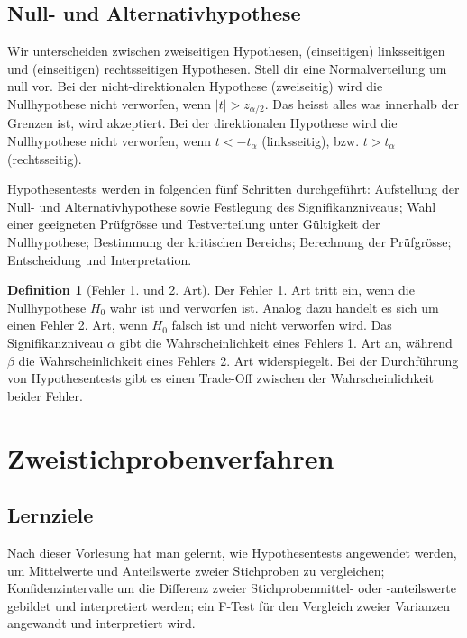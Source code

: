 \documentclass{article}
\theoremstyle{definition}
\newtheorem{definition}{Definition}
\theoremstyle{exercise}
\theoremstyle{solution}
\theoremstyle{lemma}
\begin{document}
\vspace{1em}

\subsection{Null- und Alternativhypothese}
Wir unterscheiden zwischen zweiseitigen Hypothesen, (einseitigen) linksseitigen und (einseitigen) rechtsseitigen Hypothesen. Stell dir eine Normalverteilung um null vor. Bei der nicht-direktionalen Hypothese (zweiseitig) wird die Nullhypothese nicht verworfen, wenn \(|t|>z_{\alpha/2}\). Das heisst alles was innerhalb der Grenzen ist, wird akzeptiert. Bei der direktionalen Hypothese wird die Nullhypothese nicht verworfen, wenn \(t<-t_\alpha\) (linksseitig), bzw. \(t>t_\alpha\) (rechtsseitig).

\vspace{1em}

Hypothesentests werden in folgenden fünf Schritten durchgeführt: Aufstellung der Null- und Alternativhypothese sowie Festlegung des Signifikanzniveaus; Wahl einer geeigneten Prüfgrösse und Testverteilung unter Gültigkeit der Nullhypothese; Bestimmung der kritischen Bereichs; Berechnung der Prüfgrösse; Entscheidung und Interpretation.

\begin{definition}[Fehler 1. und 2. Art]
Der Fehler 1. Art tritt ein, wenn die Nullhypothese \(H_0\) wahr ist und verworfen ist. Analog dazu handelt es sich um einen Fehler 2. Art, wenn \(H_0\) falsch ist und nicht verworfen wird. Das Signifikanzniveau \(\alpha\) gibt die Wahrscheinlichkeit eines Fehlers 1. Art an, während \(\beta\) die Wahrscheinlichkeit eines Fehlers 2. Art widerspiegelt. Bei der Durchführung von Hypothesentests gibt es einen Trade-Off zwischen der Wahrscheinlichkeit beider Fehler.
\end{definition}


\section{Zweistichprobenverfahren}
\subsection{Lernziele}
Nach dieser Vorlesung hat man gelernt, wie Hypothesentests angewendet werden, um Mittelwerte und Anteilswerte zweier Stichproben zu vergleichen; Konfidenzintervalle um die Differenz zweier Stichprobenmittel- oder -anteilswerte gebildet und interpretiert werden; ein F-Test für den Vergleich zweier Varianzen angewandt und interpretiert wird.
\end{document}
